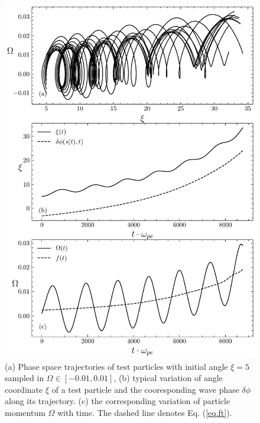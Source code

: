 \begin{figure}
    \centering
    \includegraphics[scale=0.5]{img/phaseflow.pdf}
    \caption{(a) Phase space trajectories of  test particles with initial angle $\xi = 5$ sampled in $\Omega \in [-0.01,0.01]$, (b) typical variation of angle coordinate $\xi$ of a test particle and the cooresponding wave phase $\delta \phi$ along its trajectory. (c) the corresponding variation of particle momentum $\Omega$ with time. The dashed line denotes Eq. (\ref{eq.ft}).
    \label{fig.phaseflow}
    }
\end{figure}

